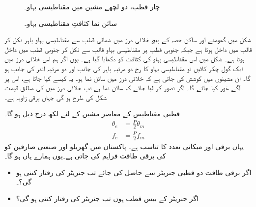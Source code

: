 \begin{figure}
\begin{minipage}{0.45\textwidth}
\caption{چار قطب، دو لچھے مشین میں مقناطیسی بہاو۔}
\label{شکل_گھومتے_مشین_چار_قطب_کا_بہاو}
\end{minipage}%
\begin{minipage}{0.45\textwidth}
\centering
\caption{سائن نما کثافتِ مقناطیسی بہاو۔}
\label{شکل_گھومتے_مشین_سائن_نما_بہاو}
\end{minipage}%
\end{figure}



شکل  میں گھومتے اور ساکن حصہ کے بیچ خلائی درز میں  شمالی قطب سے مقناطیسی بہاو باہر نکل کر  قالب میں داخل ہوتا ہے جبکہ جنوبی قطب پر مقناطیسی بہاو قالب سے نکل کر جنوبی قطب میں  داخل ہوتا ہے۔ شکل   میں اس مقناطیسی بہاو کی کثافت کو دکھایا گیا ہے۔ یوں اگر ہم اس خلائی درز میں ایک گول چکر کاٹیں تو مقناطیسی بہاو کا رخ  دو مرتبہ باہر کی جانب اور دو مرتبہ اندر کی جانب ہو گا۔ ان مشینوں  میں کوشش کی جاتی ہے کہ خلائی درز میں  سائن نما ہو۔ یہ کیسے کیا جاتا ہے، اس پر آگے غور کیا جائے گا۔ اگر تصور کر لیا جائے کہ  سائن نما ہے تب  خلائی درز میں  کی مطلق قیمت شکل   کی طرح ہو گی جہاں  برقی زاویہ ہے۔ 

 قطبی مقناطیس کے معاصر مشین  کے لئے لکھ درج ذیل ہو گا۔
\begin{align}
\theta_e&=\frac{P}{2} \theta_m\label{مساوات_گھومتے_مشین_برقی_میکانی_زاویہ_تعلق}\\
f_e&=\frac{P}{2} f_m  \label{مساوات_گھومتے_مشین_برقی_میکانی_تعدد_تعلق}
\end{align}
یہاں برقی اور میکانی  تعدد کا تناسب  ہے۔ 
%
پاکستان میں گھریلو اور صنعتی صارفین کو  کی برقی طاقت فراہم کی جاتی ہے۔یوں ہمارے ہاں  ہو گا۔
\begin{itemize}
\item
اگر برقی طاقت دو قطبی جنریٹر سے حاصل کی جائے تب جنریٹر  کی رفتار کتنی ہو گی؟۔
\item
اگر جنریٹر کے بیس قطب ہوں تب  جنریٹر کی رفتار کتنی ہو گی؟
\end{itemize}

